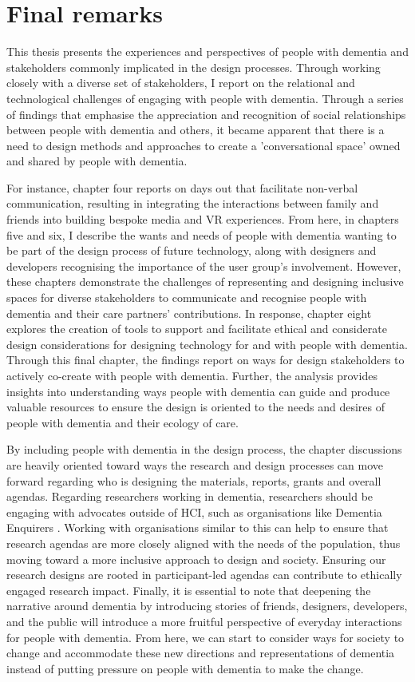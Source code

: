\section{Final remarks}
\label{Discussion:FinalRemarks}
This thesis presents the experiences and perspectives of people with dementia and stakeholders commonly implicated in the design processes. Through working closely with a diverse set of stakeholders, I report on the relational and technological challenges of engaging with people with dementia. Through a series of findings that emphasise the appreciation and recognition of social relationships between people with dementia and others, it became apparent that there is a need to design methods and approaches to create a 'conversational space' owned and shared by people with dementia.

For instance, chapter four reports on days out that facilitate non-verbal communication, resulting in integrating the interactions between family and friends into building bespoke media and VR experiences. From here, in chapters five and six, I describe the wants and needs of people with dementia wanting to be part of the design process of future technology, along with designers and developers recognising the importance of the user group's involvement. However, these chapters demonstrate the challenges of representing and designing inclusive spaces for diverse stakeholders to communicate and recognise people with dementia and their care partners' contributions. In response, chapter eight explores the creation of tools to support and facilitate ethical and considerate design considerations for designing technology for and with people with dementia. Through this final chapter, the findings report on ways for design stakeholders to actively co-create with people with dementia. Further, the analysis provides insights into understanding ways people with dementia can guide and produce valuable resources to ensure the design is oriented to the needs and desires of people with dementia and their ecology of care.

By including people with dementia in the design process, the chapter discussions are heavily oriented toward ways the research and design processes can move forward regarding who is designing the materials, reports, grants and overall agendas. Regarding researchers working in dementia, researchers should be engaging with advocates outside of HCI, such as organisations like Dementia Enquirers \citep{davies2021dementia}. Working with organisations similar to this can help to ensure that research agendas are more closely aligned with the needs of the population, thus moving toward a more inclusive approach to design and society. Ensuring our research designs are rooted in participant-led agendas can contribute to ethically engaged research impact. Finally, it is essential to note that deepening the narrative around dementia by introducing stories of friends, designers, developers, and the public will introduce a more fruitful perspective of everyday interactions for people with dementia. From here, we can start to consider ways for society to change and accommodate these new directions and representations of dementia instead of putting pressure on people with dementia to make the change.



